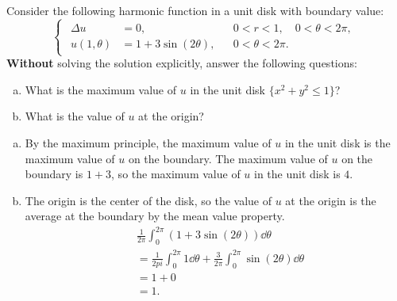 \documentclass[plain]{pset}
\begin{document}
\pagebreak

\begin{problem}
Consider the following harmonic function in a unit disk with boundary value:
\[
    \begin{cases}
        \begin{aligned}
            \Delta u     & = 0,                  &  & 0 < r < 1, \quad 0 < \theta < 2\pi, \\
            u(1, \theta) & = 1 + 3\sin(2\theta), &  & 0 < \theta < 2\pi.
        \end{aligned}
    \end{cases}
\]
\textbf{Without} solving the solution explicitly, answer the following questions:
\begin{enumerate}[(a)]
    \item What is the maximum value of \(u\) in the unit disk \(\{x^2 + y^2 \leq 1\}\)?
    \item What is the value of \(u\) at the origin?
\end{enumerate}
\end{problem}
\begin{solution}
    \leavevmode
    \begin{enumerate}[(a)]
        \item By the maximum principle, the maximum value of \(u\) in the unit disk is the maximum value of \(u\) on the boundary. The maximum value of \(u\) on the boundary is \(1 + 3\), so the maximum value of \(u\) in the unit disk is \(4\).
        \item The origin is the center of the disk, so the value of \(u\) at the origin is the average at the boundary by the mean value property.
              \begin{align*}
                   & \frac{1}{2\pi}\int_0^{2\pi} \left(1 + 3\sin(2\theta)\right) \dd{\theta}                            \\
                   & = \frac{1}{2pi}\int_0^{2\pi} 1 \dd{\theta} + \frac{3}{2\pi}\int_0^{2\pi} \sin(2\theta) \dd{\theta} \\
                   & = 1 + 0                                                                                            \\
                   & = 1.
              \end{align*}
    \end{enumerate}
\end{solution}

\pagebreak
\end{document}
